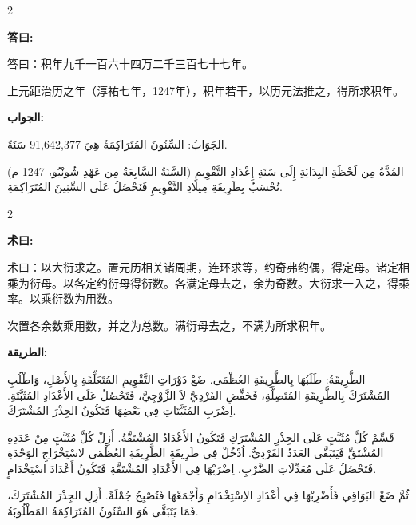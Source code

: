 \documentclass[11pt,a4paper]{article}
\newcommand{\ar}[1]{\arabicfont\beginR #1\endR}
\newenvironment{bilingual}{%
  \begin{paracol}{2}
}{%
  \end{paracol}
}
\newcommand{\cnlabel}[1]{\textcolor{algocolor}{\textbf{#1}}}
\newcommand{\arlabel}[1]{\ar{\textcolor{algocolor}{\textbf{#1}}}}
\begin{document}
\vspace{1em}

\begin{bilingual}

\begin{leftcolumn*}
\cnlabel{答曰:}

答曰：积年九千一百六十四万二千三百七十七年。

上元距治历之年（淳祐七年，1247年），积年若干，以历元法推之，得所求积年。
\end{leftcolumn*}

\begin{rightcolumn*}
\arlabel{الجواب:}

\ar{الجَوَابُ: السِّنُونَ المُتَرَاكِمَةُ هِيَ 91,642,377 سَنَةً.}

\ar{المُدَّةُ مِن لَحْظَةِ البِدَايَةِ إِلَى سَنَةِ إِعْدَادِ التَّقْوِيمِ (السَّنَةُ السَّابِعَةُ مِن عَهْدِ شُونْيُو، 1247 م) تُحْسَبُ بِطَرِيقَةِ مِيلَادِ التَّقْوِيمِ فَنَحْصُلُ عَلَى السِّنِينَ المُتَرَاكِمَةِ.}
\end{rightcolumn*}

\end{bilingual}

\vspace{1em}

\begin{bilingual}

\begin{leftcolumn*}
\cnlabel{术曰:}

术曰：以大衍求之。置元历相关诸周期，连环求等，约奇弗约偶，得定母。诸定相乘为衍母。以各定约衍母得衍数。各满定母去之，余为奇数。大衍求一入之，得乘率。以乘衍数为用数。

次置各余数乘用数，并之为总数。满衍母去之，不满为所求积年。
\end{leftcolumn*}

\begin{rightcolumn*}
\arlabel{الطريقة:}

\ar{الطَّرِيقَةُ: طَلَبُهَا بِالطَّرِيقَةِ العُظْمَى. ضَعْ دَوْرَاتِ التَّقْوِيمِ المُتَعَلِّقَةِ بِالأَصْلِ، وَاطْلُبِ المُشْتَرَكَ بِالطَّرِيقَةِ المُتَصِلَّةِ، فَخَفِّضِ الفَرْدِيَّ لاَ الزَّوْجِيَّ، فَتَحْصُلُ عَلَى الأَعْدَادِ المُثَبَّتَةِ. اِضْرَبِ المُثَبَّتَاتِ فِي بَعْضِهَا فَتَكُونُ الجِذْرَ المُشْتَرَكَ.}

\ar{قَسِّمْ كُلَّ مُثَبَّتٍ عَلَى الجِذْرِ المُشْتَرَكِ فَتَكُونُ الأَعْدَادُ المُشْتَقَّةُ. أَزِلْ كُلَّ مُثَبَّتٍ مِنْ عَدَدِهِ المُشْتَقِّ فَيَتَبَقَّى العَدَدُ الفَرْدِيُّ. اُدْخُلْ فِي طَرِيقَةِ الطَّرِيقَةِ العُظْمَى لاسْتِخْرَاجِ الوَحْدَةِ فَتَحْصُلُ عَلَى مُعَدِّلَاتِ الضَّرْبِ. اِضْرَبْهَا فِي الأَعْدَادِ المُشْتَقَّةِ فَتَكُونُ أَعْدَادَ اسْتِخْدَامٍ.}

\ar{ثُمَّ ضَعْ البَوَاقِي فَأَضْرِبْهَا فِي أَعْدَادِ الاِسْتِخْدَامِ وَأَجْمَعْهَا فَتُصْبِحُ جُمْلَةً. أَزِلِ الجِذْرَ المُشْتَرَكَ، فَمَا يَتَبَقَّى هُوَ السِّنُونُ المُتَرَاكِمَةُ المَطْلُوبَةُ.}
\end{rightcolumn*}

\end{bilingual}
\end{document}
